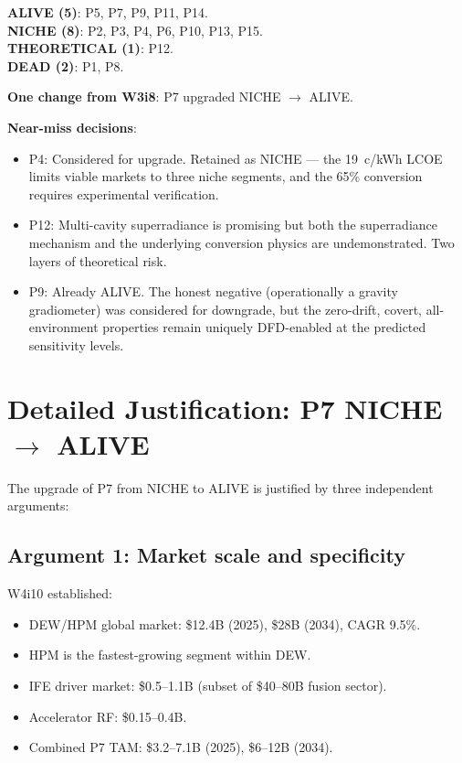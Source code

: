 \documentclass[11pt]{article}
\begin{document}
\begin{tcolorbox}[colback=green!5!white, colframe=green!60!black,
  title=\textbf{W4i11 Summary: 5 ALIVE, 8 NICHE, 1 THEORETICAL, 2 DEAD}]

\textbf{ALIVE (5)}: P5, P7, P9, P11, P14. \\
\textbf{NICHE (8)}: P2, P3, P4, P6, P10, P13, P15. \\
\textbf{THEORETICAL (1)}: P12. \\
\textbf{DEAD (2)}: P1, P8.

\medskip
\textbf{One change from W3i8}: P7 upgraded NICHE $\to$ ALIVE.

\medskip
\textbf{Near-miss decisions}:
\begin{itemize}[nosep]
  \item P4: Considered for upgrade. Retained as NICHE --- the 19~c/kWh
    LCOE limits viable markets to three niche segments, and the
    65\% conversion requires experimental verification.
  \item P12: Multi-cavity superradiance is promising but both the
    superradiance mechanism and the underlying conversion physics are
    undemonstrated. Two layers of theoretical risk.
  \item P9: Already ALIVE. The honest negative (operationally a gravity
    gradiometer) was considered for downgrade, but the zero-drift,
    covert, all-environment properties remain uniquely DFD-enabled
    at the predicted sensitivity levels.
\end{itemize}
\end{tcolorbox}

\section{Detailed Justification: P7 NICHE $\to$ ALIVE}
\label{sec:P7-upgrade}

The upgrade of P7 from NICHE to ALIVE is justified by three independent
arguments:

\subsection{Argument 1: Market scale and specificity}

W4i10 established:
\begin{itemize}[nosep]
  \item DEW/HPM global market: \$12.4B (2025), \$28B (2034), CAGR 9.5\%.
  \item HPM is the fastest-growing segment within DEW.
  \item IFE driver market: \$0.5--1.1B (subset of \$40--80B fusion sector).
  \item Accelerator RF: \$0.15--0.4B.
  \item Combined P7 TAM: \$3.2--7.1B (2025), \$6--12B (2034).
\end{itemize}
\end{document}
